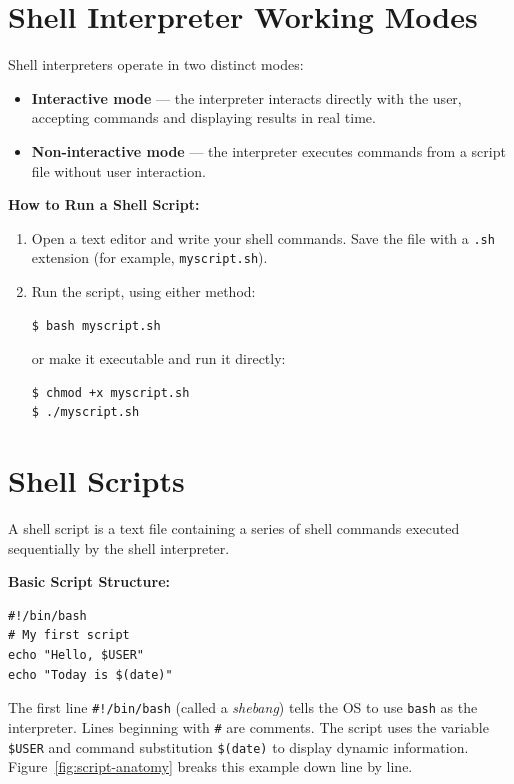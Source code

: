 \section{Shell Interpreter Working Modes}
Shell interpreters operate in two distinct modes:
\begin{itemize}
    \item \textbf{Interactive mode} --- the interpreter interacts directly with the user, accepting commands and displaying results in real time.
    \item \textbf{Non-interactive mode} --- the interpreter executes commands from a script file without user interaction.
\end{itemize}

\textbf{How to Run a Shell Script:}
\begin{enumerate}
    \item Open a text editor and write your shell commands. Save the file with a \texttt{.sh} extension (for example, \texttt{myscript.sh}).
    \item Run the script, using either method:
\begin{lstlisting}[language=Terminal]
$ bash myscript.sh
\end{lstlisting}
    or make it executable and run it directly:
\begin{lstlisting}[language=Terminal]
$ chmod +x myscript.sh
$ ./myscript.sh
\end{lstlisting}
\end{enumerate}

\section{Shell Scripts}
A shell script is a text file containing a series of shell commands executed sequentially by the shell interpreter.

\textbf{Basic Script Structure:}
\begin{lstlisting}[language=Terminal]
#!/bin/bash
# My first script
echo "Hello, $USER"
echo "Today is $(date)"
\end{lstlisting}

The first line \texttt{\#!/bin/bash} (called a \emph{shebang}) tells the OS to use \texttt{bash} as the interpreter. Lines beginning with \texttt{\#} are comments. The script uses the variable \texttt{\$USER} and command substitution \texttt{\$(date)} to display dynamic information. Figure~\ref{fig:script-anatomy} breaks this example down line by line.

